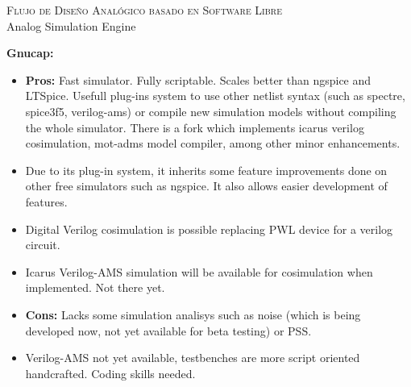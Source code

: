 \documentclass[ps,clariphy]{prosper}
\begin{document}
\begin{slide}{ \textsc{{\tiny Flujo de Dise\~no Anal\'ogico basado en Software Libre}}\\ Analog Simulation Engine}
  \vspace{-0.5cm}
  \tiny{
    \textbf{Gnucap:}
	\begin{itemize}
      	\item \textbf{Pros:} Fast simulator. Fully scriptable. Scales better than ngspice and LTSpice. Usefull plug-ins system to use other netlist
syntax (such as spectre, spice3f5, verilog-ams) or compile new simulation models without compiling
the whole simulator. There is a fork which implements icarus verilog cosimulation, mot-adms model compiler, among
other minor enhancements.
      	\item Due to its plug-in system, it inherits some feature improvements done on other free simulators such as ngspice. It also allows easier development of features.
      	\item Digital Verilog cosimulation is possible replacing PWL device for a verilog circuit. 
      	\item Icarus Verilog-AMS simulation will be available for cosimulation when implemented. Not there yet.
      	\item \textbf{Cons:} Lacks some simulation analisys such as noise (which is being developed now, not yet available for beta testing) or PSS.
      	\item Verilog-AMS not yet available, testbenches are more script oriented handcrafted. Coding skills needed.
	\end{itemize}
  }
\end{slide}
\end{document}
